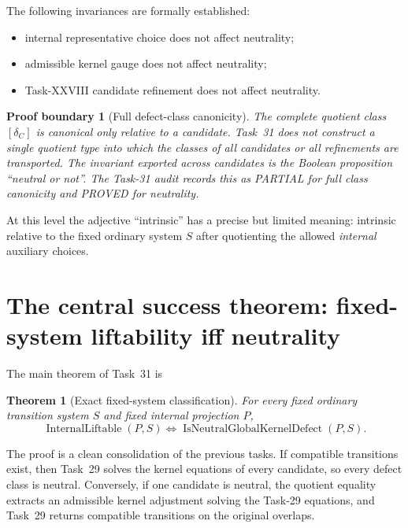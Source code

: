 \documentclass[11pt,a4paper]{article}
\newtheorem{theorem}{Theorem}
\newtheorem{boundary}{Proof boundary}
\theoremstyle{definition}
\begin{document}
The following invariances are formally established:
\begin{itemize}[leftmargin=*]
 \item internal representative choice does not affect neutrality;
 \item admissible kernel gauge does not affect neutrality;
 \item Task-XXVIII candidate refinement does not affect neutrality.
\end{itemize}

\begin{boundary}[Full defect-class canonicity]
The complete quotient class $[\delta_C]$ is canonical only relative to a candidate.  Task~31 does not construct a single quotient type into which the classes of all candidates or all refinements are transported.  The invariant exported across candidates is the Boolean proposition ``neutral or not''.  The Task-31 audit records this as PARTIAL for full class canonicity and PROVED for neutrality.
\end{boundary}

At this level the adjective ``intrinsic'' has a precise but limited meaning: intrinsic relative to the fixed ordinary system $S$ after quotienting the allowed \emph{internal} auxiliary choices.

\section{The central success theorem: fixed-system liftability iff neutrality}\label{sec:classification}

The main theorem of Task~31 is
\begin{theorem}[Exact fixed-system classification]\label{thm:classification}
For every fixed ordinary transition system $S$ and fixed internal projection $P$,
\begin{equation}\label{eq:classification}
 \boxed{
 \operatorname{InternalLiftable}(P,S)
 \iff
 \operatorname{IsNeutralGlobalKernelDefect}(P,S).}
\end{equation}
\end{theorem}

The proof is a clean consolidation of the previous tasks.  If compatible transitions exist, then Task~29 solves the kernel equations of every candidate, so every defect class is neutral.  Conversely, if one candidate is neutral, the quotient equality extracts an admissible kernel adjustment solving the Task-29 equations, and Task~29 returns compatible transitions on the original overlaps.
\end{document}
